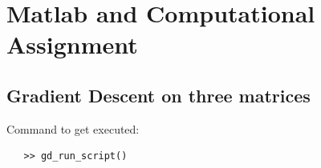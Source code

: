 \documentclass[11pt,a4paper]{article}
\begin{document}
\begin{titlepage}
    \maketitle
\end{titlepage}
\renewcommand{\contentsname}{Table of Contents}
\begin{center} 
    \tableofcontents 
    \listoffigures
\end{center}
\newpage

\section{Matlab and Computational Assignment}
\subsection{Gradient Descent on three matrices}
Command to get executed: 
\begin{verbatim}
   >> gd_run_script()
\end{verbatim}
\end{document}
